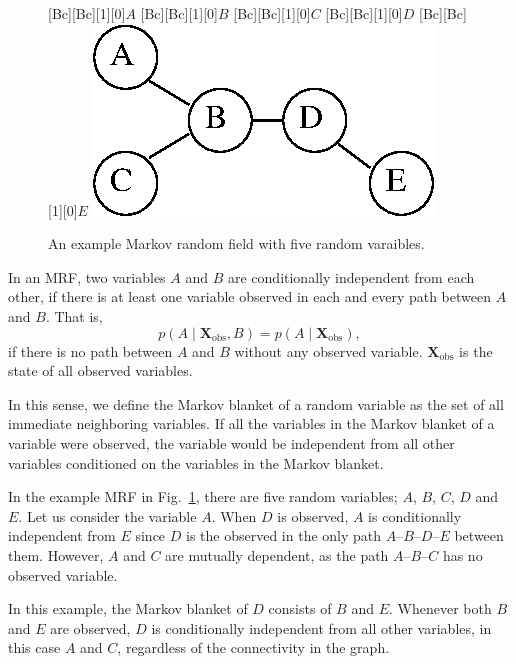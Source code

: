 \documentclass{now}
\newcommand{\matr}[1]{\mathbf{#1}}
\newcommand{\mX}[0]{\matr{X}}
\begin{document}
\begin{figure}[t]
    \centering
    [Bc][Bc][1][0]{$A$}
    [Bc][Bc][1][0]{$B$}
    [Bc][Bc][1][0]{$C$}
    [Bc][Bc][1][0]{$D$}
    [Bc][Bc][1][0]{$E$}
    \includegraphics[width=0.4\columnwidth]{../figures/mrf.eps}
    \caption{An example Markov random field with five random varaibles.}
    \label{fig:mrf}
\end{figure}


In an MRF, two variables $A$ and $B$ are conditionally independent from each
other, if there is at least one variable observed in each and every path between
$A$ and $B$.  That is, 
\[
p(A \mid \mX_{\text{obs}}, B) = p(A \mid \mX_{\text{obs}}),
\]
if there is no path between $A$ and $B$ without any observed variable.
$\mX_{\text{obs}}$ is the state of all observed variables.

In this sense, we define the Markov blanket of a random variable as the set of
all immediate neighboring variables. If all the variables in the Markov blanket
of a variable were observed, the variable would be independent from all other
variables conditioned on the variables in the Markov blanket.

In the example MRF in Fig.~\ref{fig:mrf}, there are five random variables; $A$,
$B$, $C$, $D$ and $E$. Let us consider the variable $A$. When $D$ is observed,
$A$ is conditionally independent from $E$ since $D$ is the observed in the only
path $A$--$B$--$D$--$E$ between them. However, $A$ and $C$ are mutually
dependent, as the path $A$--$B$--$C$ has no observed variable.

In this example, the Markov blanket of $D$ consists of $B$ and $E$. Whenever
both $B$ and $E$ are observed, $D$ is conditionally independent from all other
variables, in this case $A$ and $C$, regardless of the connectivity in the
graph.
\end{document}
